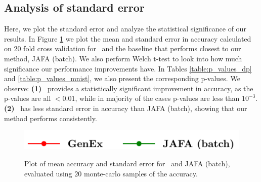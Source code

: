 \documentclass[letterpaper]{article}
\begin{document}
\subsection{Analysis of standard error}
Here, we plot the standard error and analyze the statistical significance of our results. In Figure \ref{fig:error_bars} we plot the mean and standard error in accuracy calculated on $20$ fold cross validation for \our\ and the baseline that performs closest to our method, JAFA (batch). 
We also perform Welch t-test to look into how much significance our performance improvements have. 
In Tables \ref{table:p_values_dp} and \ref{table:p_values_mnist}, we also present the corresponding p-values.  We observe: \textbf{(1)} \our\ provides a statistically significant improvement in accuracy, as the p-values are all $<0.01$, while in majority of the cases p-values are less than $10^{-3}$.  \textbf{(2)} \our\ has less standard error in accuracy than JAFA (batch), showing that our method performs consistently.
\begin{figure}[h]
    \centering
    \includegraphics[width=0.5\linewidth]{FIG/legend_errors.pdf}\\
 \hspace{0.5mm}
\hspace{0.5mm}
\hspace{0.5mm}
\vspace{-1mm}
\caption{Plot of mean accuracy and standard error for \our\ and JAFA (batch), evaluated using $20$ monte-carlo samples of the accuracy.}\vspace{-1mm}
\label{fig:error_bars}
\end{figure}
\end{document}
